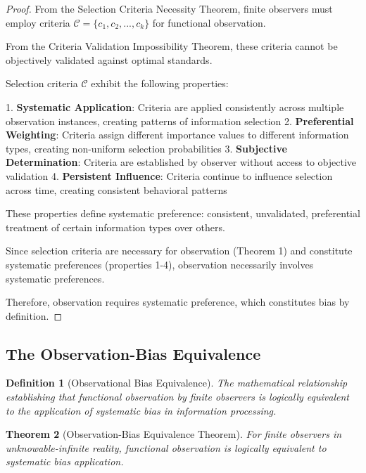\documentclass[12pt,a4paper]{article}
\newtheorem{theorem}{Theorem}[section]
\newtheorem{definition}[theorem]{Definition}
\begin{document}
\begin{proof}
From the Selection Criteria Necessity Theorem, finite observers must employ criteria $\mathcal{C} = \{c_1, c_2, ..., c_k\}$ for functional observation.

From the Criteria Validation Impossibility Theorem, these criteria cannot be objectively validated against optimal standards.

Selection criteria $\mathcal{C}$ exhibit the following properties:

1. \textbf{Systematic Application}: Criteria are applied consistently across multiple observation instances, creating patterns of information selection
2. \textbf{Preferential Weighting}: Criteria assign different importance values to different information types, creating non-uniform selection probabilities
3. \textbf{Subjective Determination}: Criteria are established by observer without access to objective validation
4. \textbf{Persistent Influence}: Criteria continue to influence selection across time, creating consistent behavioral patterns

These properties define systematic preference: consistent, unvalidated, preferential treatment of certain information types over others.

Since selection criteria are necessary for observation (Theorem 1) and constitute systematic preferences (properties 1-4), observation necessarily involves systematic preferences.

Therefore, observation requires systematic preference, which constitutes bias by definition.
\end{proof}

\subsection{The Observation-Bias Equivalence}

\begin{definition}[Observational Bias Equivalence]
The mathematical relationship establishing that functional observation by finite observers is logically equivalent to the application of systematic bias in information processing.
\end{definition}

\begin{theorem}[Observation-Bias Equivalence Theorem]
For finite observers in unknowable-infinite reality, functional observation is logically equivalent to systematic bias application.
\end{theorem}
\end{document}
